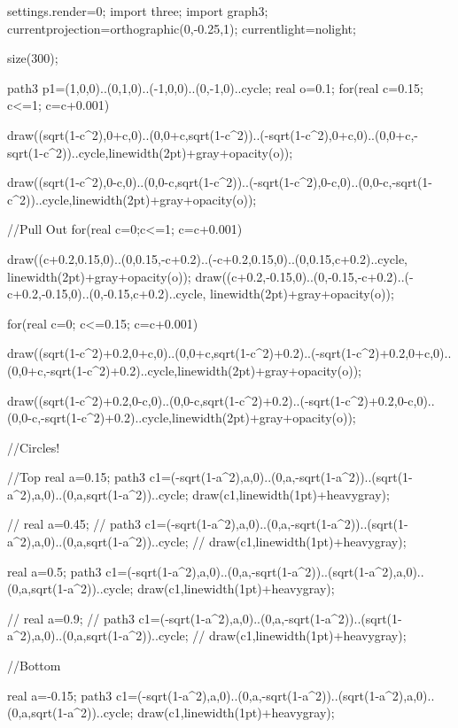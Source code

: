 
  	settings.render=0;
	import three;
    import graph3;
    currentprojection=orthographic(0,-0.25,1);
    currentlight=nolight;

	size(300);

  	path3 p1=(1,0,0)..(0,1,0)..(-1,0,0)..(0,-1,0)..cycle; 
  	real o=0.1;
  	for(real c=0.15; c<=1; c=c+0.001)
        {
        	draw((sqrt(1-c^2),0+c,0)..(0,0+c,sqrt(1-c^2))..(-sqrt(1-c^2),0+c,0)..(0,0+c,-sqrt(1-c^2))..cycle,linewidth(2pt)+gray+opacity(o));
        	
        	draw((sqrt(1-c^2),0-c,0)..(0,0-c,sqrt(1-c^2))..(-sqrt(1-c^2),0-c,0)..(0,0-c,-sqrt(1-c^2))..cycle,linewidth(2pt)+gray+opacity(o));
        }
        
		//Pull Out        
        for(real c=0;c<=1; c=c+0.001)
   		{
   			draw((c+0.2,0.15,0)..(0,0.15,-c+0.2)..(-c+0.2,0.15,0)..(0,0.15,c+0.2)..cycle, linewidth(2pt)+gray+opacity(o));
   			draw((c+0.2,-0.15,0)..(0,-0.15,-c+0.2)..(-c+0.2,-0.15,0)..(0,-0.15,c+0.2)..cycle, linewidth(2pt)+gray+opacity(o));
   			
   		}
        
       for(real c=0; c<=0.15; c=c+0.001)
        {
        	draw((sqrt(1-c^2)+0.2,0+c,0)..(0,0+c,sqrt(1-c^2)+0.2)..(-sqrt(1-c^2)+0.2,0+c,0)..(0,0+c,-sqrt(1-c^2)+0.2)..cycle,linewidth(2pt)+gray+opacity(o));
        	
        	draw((sqrt(1-c^2)+0.2,0-c,0)..(0,0-c,sqrt(1-c^2)+0.2)..(-sqrt(1-c^2)+0.2,0-c,0)..(0,0-c,-sqrt(1-c^2)+0.2)..cycle,linewidth(2pt)+gray+opacity(o));
        }
        
        
	//Circles!
    
    	//Top
		real a=0.15;
		path3 c1=(-sqrt(1-a^2),a,0)..(0,a,-sqrt(1-a^2))..(sqrt(1-a^2),a,0)..(0,a,sqrt(1-a^2))..cycle;
    	draw(c1,linewidth(1pt)+heavygray);
    	
    //	real a=0.45;
	//	path3 c1=(-sqrt(1-a^2),a,0)..(0,a,-sqrt(1-a^2))..(sqrt(1-a^2),a,0)..(0,a,sqrt(1-a^2))..cycle;
    //	draw(c1,linewidth(1pt)+heavygray);
    	
    	real a=0.5;
		path3 c1=(-sqrt(1-a^2),a,0)..(0,a,-sqrt(1-a^2))..(sqrt(1-a^2),a,0)..(0,a,sqrt(1-a^2))..cycle;
    	draw(c1,linewidth(1pt)+heavygray);
    	
    //	real a=0.9;
	//	path3 c1=(-sqrt(1-a^2),a,0)..(0,a,-sqrt(1-a^2))..(sqrt(1-a^2),a,0)..(0,a,sqrt(1-a^2))..cycle;
   // 	draw(c1,linewidth(1pt)+heavygray);
    	
    	//Bottom
    	
    	real a=-0.15;
		path3 c1=(-sqrt(1-a^2),a,0)..(0,a,-sqrt(1-a^2))..(sqrt(1-a^2),a,0)..(0,a,sqrt(1-a^2))..cycle;
    	draw(c1,linewidth(1pt)+heavygray);
    	
